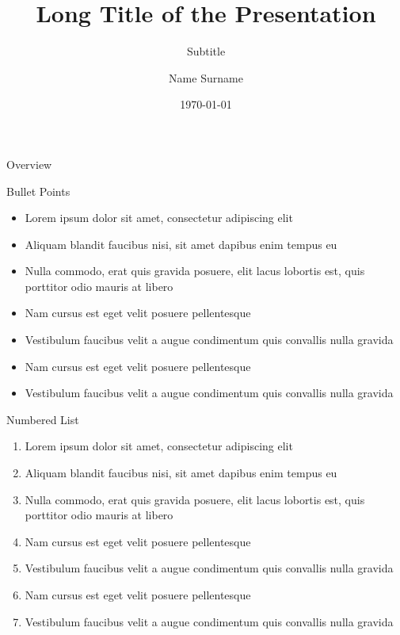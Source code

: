 \documentclass[aspectratio=169,xcolor=dvipsnames, t]{beamer}
\title[short title]{Long Title of the Presentation} %
\subtitle{Subtitle}
\author{Name Surname}
\institute[University of Groningen, Faculty Science and Engineering]{Faculty Science and Engineering
\newline
University of Groningen
}
\date{\today} %
\begin{document}
\maketitlepage

\begin{frame}[t]{Overview}
    \tableofcontents
\end{frame}


\begin{frame}{Bullet Points}
    \begin{itemize}
        \item Lorem ipsum dolor sit amet, consectetur adipiscing elit
        \item Aliquam blandit faucibus nisi, sit amet dapibus enim tempus eu
        \item Nulla commodo, erat quis gravida posuere, elit lacus lobortis est, quis porttitor odio mauris at libero
        \item Nam cursus est eget velit posuere pellentesque
        \item Vestibulum faucibus velit a augue condimentum quis convallis nulla gravida
        \item Nam cursus est eget velit posuere pellentesque
        \item Vestibulum faucibus velit a augue condimentum quis convallis nulla gravida
    \end{itemize}
\end{frame}

\begin{frame}{Numbered List}
    \begin{enumerate}
        \item Lorem ipsum dolor sit amet, consectetur adipiscing elit
        \item Aliquam blandit faucibus nisi, sit amet dapibus enim tempus eu
        \item Nulla commodo, erat quis gravida posuere, elit lacus lobortis est, quis porttitor odio mauris at libero
        \item Nam cursus est eget velit posuere pellentesque
        \item Vestibulum faucibus velit a augue condimentum quis convallis nulla gravida
        \item Nam cursus est eget velit posuere pellentesque
        \item Vestibulum faucibus velit a augue condimentum quis convallis nulla gravida
    \end{enumerate}
\end{frame}
\end{document}
